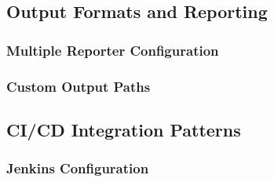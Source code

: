 \subsection{Output Formats and
Reporting}\label{output-formats-and-reporting}

\subsubsection{Multiple Reporter
Configuration}\label{multiple-reporter-configuration}

\begin{Shaded}
\begin{Highlighting}[]
\FunctionTok{\{}
  \FunctionTok{:} \FunctionTok{\{}
    \FunctionTok{:} \OtherTok{[}
      \OtherTok{,}
      \OtherTok{,}
      \OtherTok{[}\OtherTok{,} \FunctionTok{\{}\FunctionTok{:} \FunctionTok{\}}\OtherTok{]}
    \OtherTok{]}
  \FunctionTok{\}}
\FunctionTok{\}}
\end{Highlighting}
\end{Shaded}

\subsubsection{Custom Output Paths}\label{custom-output-paths}

\begin{Shaded}
\begin{Highlighting}[]
\FunctionTok{\{}
  \FunctionTok{:} \FunctionTok{\{}
    \FunctionTok{:} \FunctionTok{,}
    \FunctionTok{:} 
  \FunctionTok{\}}
\FunctionTok{\}}
\end{Highlighting}
\end{Shaded}

\subsection{CI/CD Integration Patterns}\label{cicd-integration-patterns}

\subsubsection{Jenkins Configuration}\label{jenkins-configuration}

